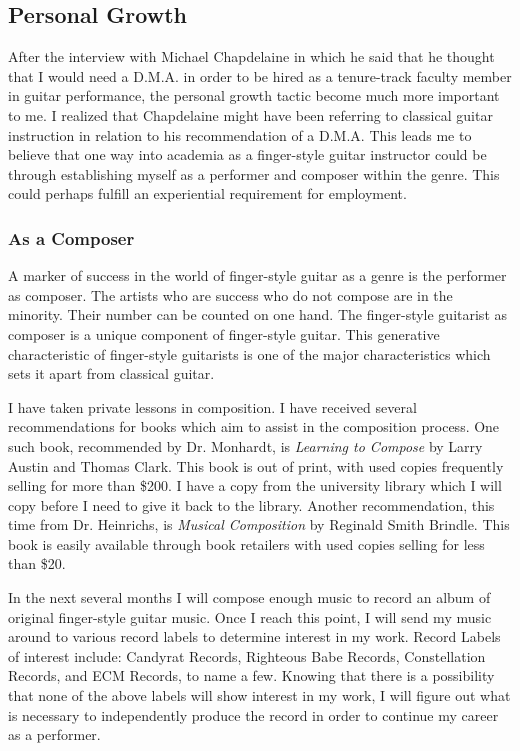 \documentclass[12pt]{article}
\begin{document}
\subsection{Personal Growth}
\label{sec:personal-growth}
After the interview with Michael Chapdelaine in which he said that he
thought that I would need a D.M.A. in order to be hired as a
tenure-track faculty member in guitar performance, the personal growth
tactic become much more important to me. I realized that Chapdelaine
might have been referring to classical guitar instruction in relation
to his recommendation of a D.M.A. This leads me to believe that one
way into academia as a finger-style guitar instructor could be through
establishing myself as a performer and composer within the genre. This
could perhaps fulfill an experiential requirement for employment.
\subsubsection{As a Composer}
\label{sec:composer}
A marker of success in the world of finger-style guitar as a genre is
the performer as composer. The artists who are success who do not
compose are in the minority. Their number can be counted on one
hand. The finger-style guitarist as composer is a unique component of
finger-style guitar. This generative characteristic of finger-style
guitarists is one of the major characteristics which sets it apart
from classical guitar.

I have taken private lessons in composition. I have received several
recommendations for books which aim to assist in the composition
process. One such book, recommended by Dr. Monhardt, is \emph{Learning
  to Compose} by Larry Austin and Thomas Clark.\autocite{austin1989}
This book is out of print, with used copies frequently selling for
more than \$200. I have a copy from the university library which I
will copy before I need to give it back to the library. Another
recommendation, this time from Dr. Heinrichs, is \emph{Musical
  Composition} by Reginald Smith Brindle.\autocite{brindle} This book
is easily available through book retailers with used copies selling
for less than \$20.

In the next several months I will compose enough music to record an
album of original finger-style guitar music. Once I reach this point,
I will send my music around to various record labels to determine
interest in my work. Record Labels of interest include: Candyrat
Records, Righteous Babe Records, Constellation Records, and ECM
Records, to name a few. Knowing that there is a possibility that none
of the above labels will show interest in my work, I will figure out
what is necessary to independently produce the record in order to
continue my career as a performer.
\end{document}
